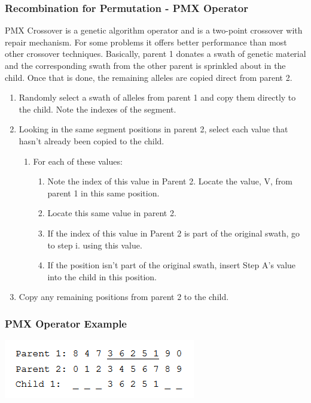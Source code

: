 \documentclass[11pt]{article}
\begin{document}
\subsubsection{Recombination for Permutation - PMX Operator}
PMX Crossover is a genetic algorithm operator and is a two-point crossover with repair mechanism. For some problems it offers better performance than most other crossover techniques. Basically, parent 1 donates a swath of genetic material and the corresponding swath from the other parent is sprinkled about in the child. Once that is done, the remaining alleles are copied direct from parent 2.

\begin{enumerate}
	\item Randomly select a swath of alleles from parent 1 and copy them directly to the child. Note the indexes of the segment.
	\item Looking in the same segment positions in parent 2, select each value that hasn't already been copied to the child.
	\begin{enumerate}[label=\Alph*.]
		\item For each of these values:
		\begin{enumerate}[label=\roman*.]
			\item Note the index of this value in Parent 2. Locate the value, V, from parent 1 in this same position.
			\item Locate this same value in parent 2.
			\item If the index of this value in Parent 2 is part of the original swath, go to step i. using this value.
			\item If the position isn't part of the original swath, insert Step A's value into the child in this position.
		\end{enumerate}
	\end{enumerate}
	\item Copy any remaining positions from parent 2 to the child.
\end{enumerate}

\subsubsection{PMX Operator Example}
\includegraphics[width=0.4\linewidth]{img/pmx_example_01}
\end{document}
